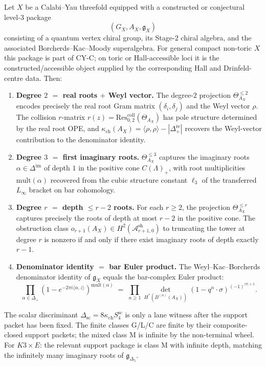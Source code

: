 \begin{conjecture}[Automorphic correction \texorpdfstring{$=$}{=} shadow obstruction tower]
\label{thm:thy-autshadow-main}
\ClaimStatusConjectured
Let $X$ be a Calabi--Yau threefold equipped with a constructed or
conjectural level-$3$ package
\[
 (G_X,A_X,\mathfrak g_X)
\]
consisting of a quantum vertex chiral group, its Stage-$2$ chiral
algebra, and the associated Borcherds--Kac--Moody superalgebra. For
general compact non-toric $X$ this package is part of CY-C; on toric or
Hall-accessible loci it is the constructed/accessible object supplied by
the corresponding Hall and Drinfeld-centre data. Then:
\begin{enumerate}[label=\textup{(\alph*)}]
\item \textbf{Degree $2$ $=$ real roots $+$ Weyl vector.}
The degree-$2$ projection $\Theta^{\leq 2}_{A_X}$ encodes precisely the
real root Gram matrix $(\delta_i,\delta_j)$ and the Weyl vector $\rho$.
The collision $r$-matrix $r(z)=\mathrm{Res}^{\mathrm{coll}}_{0,2}(\Theta_{A_X})$
has pole structure determined by the real root OPE, and
$\kappa_{\mathrm{ch}}(A_X)=\langle\rho,\rho\rangle-|\Delta^{\mathrm{re}}_+|$
recovers the Weyl-vector contribution to the denominator identity.

\item \textbf{Degree $3$ $=$ first imaginary roots.}
$\Theta^{\leq 3}_{A_X}$ captures the imaginary roots $\alpha\in\Delta^{\mathrm{im}}$
of depth $1$ in the positive cone $C(\Lambda)_+$, with root multiplicities
$\mathrm{mult}(\alpha)$ recovered from the cubic structure constant $\ell_3$ of
the transferred $L_\infty$ bracket on bar cohomology.

\item \textbf{Degree $r$ $=$ depth $\leq r-2$ roots.}
For each $r\geq 2$, the projection $\Theta^{\leq r}_{A_X}$ captures precisely
the roots of depth at most $r-2$ in the positive cone. The obstruction class
$o_{r+1}(A_X)\in H^2(\mathcal{A}^{\mathrm{sh}}_{r+1,0})$ to truncating the tower
at degree $r$ is nonzero if and only if there exist imaginary roots of depth
exactly $r-1$.

\item \textbf{Denominator identity $=$ bar Euler product.}
The Weyl--Kac--Borcherds denominator identity of $\mathfrak{g}_X$ equals the
bar-complex Euler product:
\[
\prod_{\alpha\in\Delta_+}(1-e^{-2\pi i\langle\alpha,z\rangle})^{\mathrm{mult}(\alpha)}
\;=\;\prod_{n\geq 1}
\det_{H^*(B^{(n)}(A_X))}(1-q^n\cdot\sigma)^{(-1)^{|\sigma|+1}}.
\]
\end{enumerate}
The scalar discriminant $\Delta_{\mathrm{sc}}=8\kappa_{\mathrm{ch}}S^{\mathrm{sc}}_4$
is only a lane witness after the support packet has been fixed.  The
finite classes G/L/C are finite by their composite-closed support packets;
the mixed class M is infinite by the non-terminal wheel. For $K3\times E$:
the relevant support package is class M with infinite depth, matching the
infinitely many imaginary roots of $\mathfrak{g}_{\Delta_5}$.
\end{conjecture}
